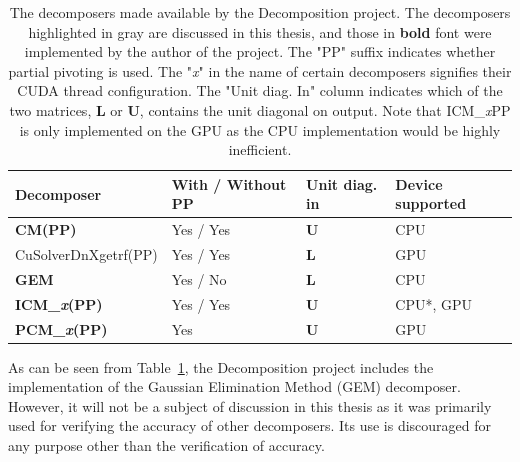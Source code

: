 \begin{table}[ht!]
	\centering
	\begin{tabular}{|l|l|l|l|}
		\hline
		\rowcolor[HTML]{C0C0C0} \textbf{Decomposer}          & \textbf{With / Without PP} & \textbf{Unit diag. in} & \textbf{Device supported} \\ \hline
		\cellcolor[HTML]{EFEFEF}\textbf{CM(PP)}              & Yes / Yes                  & $\mathbf{U}$           & CPU                       \\
		\cellcolor[HTML]{EFEFEF}CuSolverDnXgetrf(PP)         & Yes / Yes                  & $\mathbf{L}$           & GPU                       \\
		\textbf{GEM}                                         & Yes / No                   & $\mathbf{L}$           & CPU                       \\
		\cellcolor[HTML]{EFEFEF}\textbf{ICM\_\textit{x}(PP)} & Yes / Yes                  & $\mathbf{U}$           & CPU*, GPU                 \\
		\cellcolor[HTML]{EFEFEF}\textbf{PCM\_\textit{x}(PP)} & Yes                        & $\mathbf{U}$           & GPU                       \\ \hline
	\end{tabular}
	\caption{The decomposers made available by the Decomposition project.
		The decomposers highlighted in gray are discussed in this thesis, and those in \textbf{bold} font were implemented by the author of the project.
		The "PP" suffix indicates whether partial pivoting is used.
		The "\textit{x}" in the name of certain decomposers signifies their CUDA thread configuration.
		The "Unit diag.	In" column indicates which of the two matrices, $\mathbf{L}$ or $\mathbf{U}$, contains the unit diagonal on output.
		Note that ICM\_\textit{x}PP is only implemented on the GPU as the CPU implementation would be highly inefficient.
	}
	\label{Table:implementation->decomposition-project->implemented-solutions->decomposers->decomposers-in-the-project}
\end{table}

As can be seen from Table~\ref{Table:implementation->decomposition-project->implemented-solutions->decomposers->decomposers-in-the-project}, the Decomposition project includes the implementation of the Gaussian Elimination Method (GEM) decomposer.
However, it will not be a subject of discussion in this thesis as it was primarily used for verifying the accuracy of other decomposers.
Its use is discouraged for any purpose other than the verification of accuracy.

